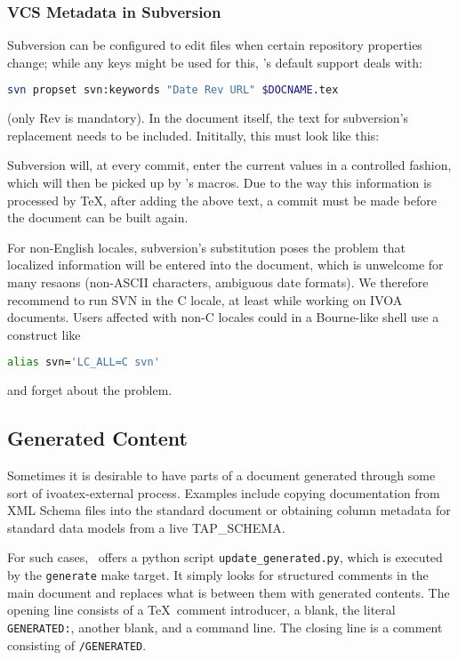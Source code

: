 \documentclass[11pt,a4paper]{ivoa}
\begin{document}
\subsubsection{VCS Metadata in Subversion}

Subversion can be configured to edit files when certain repository
properties change; while any keys might be used for this, \ivoatex's
default support deals with:

\begin{lstlisting}[language=sh]
svn propset svn:keywords "Date Rev URL" $DOCNAME.tex
\end{lstlisting}

(only Rev is mandatory).
In the document itself, the text for subversion's replacement needs to
be included.  Inititally, this must look like this:



Subversion will, at every commit, enter the current values in a
controlled fashion, which will then be picked up by \ivoatex's macros.
Due to the way this information is processed by \TeX, after adding the above
text, a commit must be made before the document can be built again.

For non-English locales, subversion's substitution poses the problem that
localized information will be entered into the document, which is
unwelcome for many resaons (non-ASCII characters, ambiguous date
formats).  We therefore recommend to run SVN in the C
locale, at least while working on IVOA documents.  Users affected with
non-C locales
could in a Bourne-like shell use a construct like
\begin{lstlisting}[language=sh]
alias svn='LC_ALL=C svn'
\end{lstlisting}
and forget about the problem.


\subsection{Generated Content}
\label{sect:generated}

Sometimes it is desirable to have parts of a document generated through
some sort of ivoatex-external process.  Examples include copying
documentation from XML Schema files into the standard document 
or obtaining column metadata for standard
data models from a live TAP\_SCHEMA.

For such cases, \ivoatex\ offers a python script
\texttt{update\_generated.py}, which is executed by the
\texttt{generate} make target.  It simply looks for structured comments
in the main document and replaces what is between them with generated
contents.  The opening line consists of a \TeX~comment introducer, a
blank, the literal \texttt{GENERATED:}, another blank, and a command
line.  The closing line is a comment consisting of \texttt{/GENERATED}.
\end{document}
